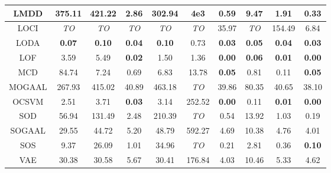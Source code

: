 \begin{table}[!t]
\begin{center}
\begin{small}
\begin{tabular}{|c|c|c|c|c|c|c|c|c|c|}
\hline
LMDD &        375.11 &             421.22 &          2.86 &              302.94 &       4e3 &               0.59 &            9.47 &          1.91 &          0.33 \\
\hline
LOCI &   \textit{TO} &        \textit{TO} &   \textit{TO} &         \textit{TO} &   \textit{TO} &              35.97 &     \textit{TO} &        154.49 &          6.84 \\
\hline
LODA & \textbf{0.07} &      \textbf{0.10} & \textbf{0.04} &       \textbf{0.10} &          0.73 &      \textbf{0.03} &   \textbf{0.05} & \textbf{0.04} & \textbf{0.03} \\
\hline
LOF &          3.59 &               5.49 & \textbf{0.02} &                1.50 &          1.36 &      \textbf{0.00} &   \textbf{0.06} & \textbf{0.01} & \textbf{0.00} \\
\hline
MCD &         84.74 &               7.24 &          0.69 &                6.83 &         13.78 &      \textbf{0.05} &            0.81 &          0.11 & \textbf{0.05} \\
\hline
MOGAAL &        267.93 &             415.02 &         40.89 &              463.18 &   \textit{TO} &              39.86 &           80.35 &         40.65 &         38.10 \\
\hline
OCSVM &          2.51 &               3.71 & \textbf{0.03} &                3.14 &        252.52 &      \textbf{0.00} &            0.11 & \textbf{0.01} & \textbf{0.00} \\
\hline
SOD &         56.94 &             131.49 &          2.48 &              210.39 &   \textit{TO} &               0.54 &           13.92 &          1.03 &          0.19 \\
\hline
SOGAAL &         29.55 &              44.72 &          5.20 &               48.79 &        592.27 &               4.69 &           10.38 &          4.76 &          4.01 \\
\hline
SOS &          9.37 &              26.09 &          1.01 &               34.96 &   \textit{TO} &               0.21 &            2.81 &          0.36 & \textbf{0.10} \\
\hline
VAE &         30.38 &              30.58 &          5.67 &               30.41 &        176.84 &               4.03 &           10.46 &          5.33 &          4.62 \\
\hline
\end{tabular}
\end{small}
\end{center}
\vskip -0.1in
\end{table}


